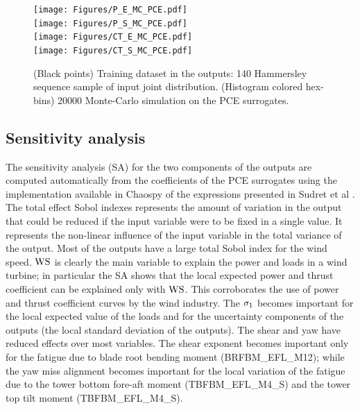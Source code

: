 \documentclass[preprint,12pt]{elsarticle}
\begin{document}
\begin{figure}[h!]
\begin{centering}
\texttt{[image: Figures/P\_E\_MC\_PCE.pdf]} \\
\texttt{[image: Figures/P\_S\_MC\_PCE.pdf]} \\
\texttt{[image: Figures/CT\_E\_MC\_PCE.pdf]} \\
\texttt{[image: Figures/CT\_S\_MC\_PCE.pdf]}
\caption{(Black points) Training dataset in the outputs: 140 Hammersley sequence sample of input joint distribution. (Histogram colored hex-bins) 20000 Monte-Carlo simulation on the PCE surrogates.}
\label{fig_y_hat_E_V}
\end{centering}
\end{figure}

\subsection{Sensitivity analysis}

The sensitivity analysis (SA) for the two components of the outputs are computed automatically from the coefficients of the PCE surrogates using the implementation available in Chaospy \cite{feinberg2015chaospy} of the expressions presented in Sudret et al \cite{sudret2008global}. The total effect Sobol indexes represents the amount of variation in the output that could be reduced if the input variable were to be fixed in  a single value. It represents the non-linear influence of the input variable in the total variance of the output. Most of the outputs have a large total Sobol index for the wind speed. $\text{WS}$ is clearly the main variable to explain the power and loads in a wind turbine; in particular the SA shows that the local expected power and thrust coefficient can be explained only with $\text{WS}$. This corroborates the use of power and thrust coefficient curves by the wind industry. The $\sigma_{1}$ becomes important for the local expected value of the loads and for the uncertainty components of the outputs (the local standard deviation of the outputs). The shear and yaw have reduced effects over most variables. The shear exponent becomes important only for the fatigue due to blade root bending moment (BRFBM\_EFL\_M12); while the yaw miss alignment becomes important for the local variation of the fatigue due to the tower bottom fore-aft moment (TBFBM\_EFL\_M4\_S) and the tower top tilt moment (TBFBM\_EFL\_M4\_S).
\end{document}
